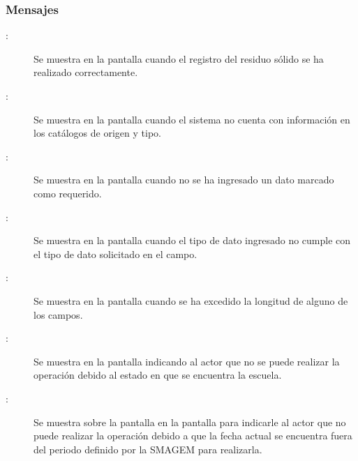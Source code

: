 \subsubsection{Mensajes}

    \begin{description}
      
	    \item [:] Se muestra en la pantalla  cuando el registro del residuo sólido se ha realizado correctamente.	    
	    
	    \item [:] Se muestra en la pantalla  cuando el sistema no cuenta con información en los catálogos de origen y tipo.
	    
	    \item [:] Se muestra en la pantalla  cuando no se ha ingresado un dato marcado como requerido.
	    
	     \item [:] Se muestra en la pantalla  cuando el tipo de dato ingresado no cumple con el tipo de dato solicitado en el campo.
	    
	    \item [:] Se muestra en la pantalla  cuando se ha excedido la longitud de alguno de los campos.

	     \item[:] Se muestra en la pantalla  indicando al actor que no se puede realizar la operación debido al estado en que se encuentra la escuela.
	   
	   \item [:] Se muestra sobre la pantalla en la pantalla  para indicarle al actor que no puede realizar la operación debido a que la fecha actual se encuentra fuera del periodo definido por la SMAGEM para realizarla.
	    
    \end{description}

